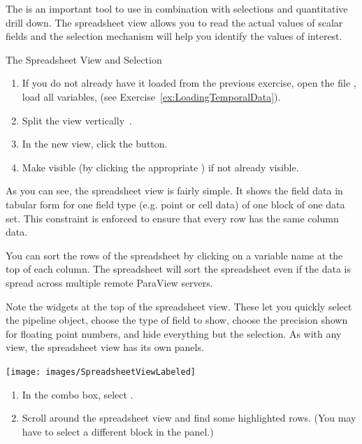 The  is an important tool to use in combination
with selections and quantitative drill down.  The spreadsheet view
allows you to read the actual values of scalar fields and the
selection mechanism will help you identify the values of interest.

\begin{exercise}{The Spreadsheet View and Selection}
  \label{ex:TheSpreadsheetViewAndSelection}%
  \begin{enumerate}
  \item If you do not already have it loaded from the previous exercise,
    open the file , load all variables, \apply (see
    Exercise~\ref{ex:LoadingTemporalData}).
  \item Split the view vertically~\splitViewV.
  \item In the new view, click the  button.
  \item Make  visible (by clicking the appropriate \eyeballg)
    if not already visible.
    \savecounter
  \end{enumerate}

  As you can see, the spreadsheet view is fairly simple.  It shows the
  field data in tabular form for one field type (e.g. point or cell data)
  of one block of one data set.  This constraint is enforced to ensure that
  every row has the same column data.

  You can sort the rows of the spreadsheet by clicking on a variable 
  name at the top of each column.  The spreadsheet will sort the 
  spreadsheet even if the data is spread across multiple remote ParaView 
  servers.
 
  Note the widgets at the top of the spreadsheet view.  These let you
  quickly select the pipeline object, choose the type of field to show,
  choose the precision shown for floating point numbers, and hide
  everything but the selection.  As with any view, the spreadsheet view has
  its own  panels.

  \begin{inlinefig}
    \texttt{[image: images/SpreadsheetViewLabeled]}
  \end{inlinefig}

  \begin{enumerate}
    \restorecounter
  \item In the  combo box, select .
  \item Scroll around the spreadsheet view and find some highlighted rows.
    (You may have to select a different block in the  panel.)
    \savecounter
  \end{enumerate}


\end{exercise}
